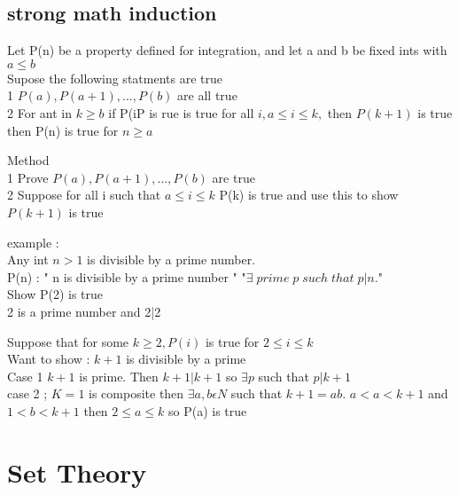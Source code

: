 \documentclass[10pt,letterpaper]{report}
\begin{document}
\section{strong math induction}
\par{ Let P(n) be a property defined for integration, and let a and b be fixed ints with $a \leq b$ \\ Supose the following statments are true \\ 1 $P(a) , P(a+1) , ... , P(b) $ are all true \\ 2 For ant in $ k \geq b$ if P(iP is rue is true for all $ i, a\leq i \leq k , $ then $ P(k+1) $ is true \\ then P(n) is true for $ n \geq a $ }
\par{ Method  \\ 1 Prove $P(a) , P(a+1) , ... , P(b) $ are true  \\ 2 Suppose for all i such that  $a\leq i \leq k $ P(k) is true and use this to show $ P(k+1) $ is true }
\par{ example : \\ Any int $ n > 1 $ is divisible by a prime number. \\ P(n) : " n is divisible by a prime number " "$ \exists \;prime\; p\;such \; that \; p|n. $" \\ Show P(2) is true \\ 2 is a prime number and 2|2 }
\par{ Suppose that for some $ k \geq 2 , P(i) $ is true for $ 2 \leq i \leq k $ \\ Want to show : $k+ 1 $ is divisible by a prime \\ Case 1 $k+1 $ is prime. Then $ k+1 | k+1 $ so $ \exists	 p $ such that $ p|k+1$ \\ case 2 ; $ K=1$ is composite then $ \exists a,b \epsilon N  $ such that $ k+1 = ab. $  $ a < a < k+1 $ and $ 1 < b < k+1 $ then $ 2 \leq a \leq k $ so P(a) is true  }
\chapter{Set Theory }
\end{document}
